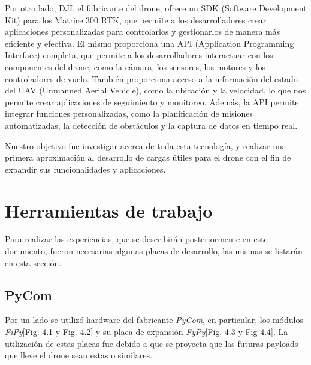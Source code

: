 \documentclass[12pt]{article}
\begin{document}
Por otro lado, DJI, el fabricante del drone, ofrece un SDK (Software Development Kit) para los Matrice 300 RTK, que permite a los desarrolladores crear aplicaciones personalizadas para controlarlos y gestionarlos de manera más eficiente y efectiva. El mismo proporciona una API (Application Programming Interface) completa, que permite a los desarrolladores interactuar con los componentes del drone, como la cámara, los sensores, los motores y los controladores de vuelo. También proporciona acceso a la información del estado del UAV (Unmanned Aerial Vehicle), como la ubicación y la velocidad, lo que nos permite crear aplicaciones de seguimiento y monitoreo. Además, la API permite integrar funciones personalizadas, como la planificación de misiones automatizadas, la detección de obstáculos y la captura de datos en tiempo real.

Nuestro objetivo fue investigar acerca de toda esta tecnología, y realizar una primera aproximación al desarrollo de cargas útiles para el drone con el fin de expandir sus funcionalidades y aplicaciones.

\newpage
\section{Herramientas de trabajo}
\justifying
Para realizar las experiencias, que se describirán posteriormente en este documento, fueron necesarias algunas placas de desarrollo, las mismas se listarán en esta sección.
\subsection{PyCom}
Por un lado se utilizó hardware del fabricante \textit{PyCom}, en particular, los módulos \textit{FiPy}[Fig. 4.1 y Fig. 4.2] y su placa de expansión \textit{FyPy}[Fig. 4.3 y Fig 4.4]. La utilización de estas placas fue debido a que se proyecta que las futuras payloads que lleve el drone sean estas o similares.
\end{document}

